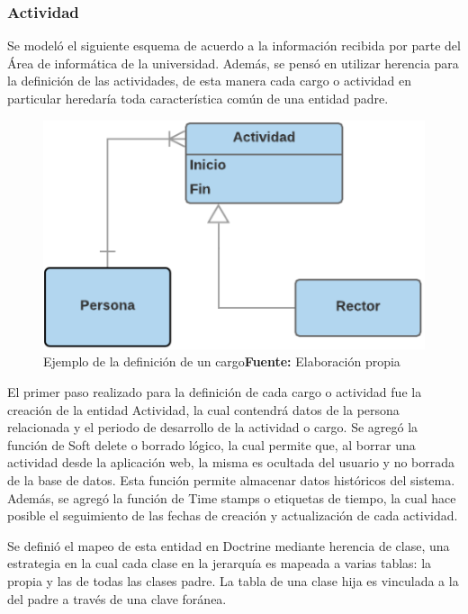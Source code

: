 \subsubsection{Actividad}%
\label{ssub:actividad}
Se modeló el siguiente esquema de acuerdo a la información recibida por parte del Área de informática de la universidad\@.
Además, se pensó en utilizar herencia para la definición de las actividades, de esta manera cada cargo o actividad en particular
heredaría toda característica común de una entidad padre.

\begin{figure}[h]
    \includegraphics[scale=1]{image/actividad-modelo.png}
    \caption{Ejemplo de la definición de un cargo\newline \textbf{Fuente:} Elaboración propia}%
    \label{fig:image/actividad-modelo}
\end{figure}
El primer paso realizado para la definición de cada cargo o actividad fue la creación de la entidad Actividad, la cual contendrá
datos de la persona relacionada y el periodo de desarrollo de la actividad o cargo\@.
Se agregó la función de Soft delete o borrado lógico, la cual permite que, al borrar una actividad desde la aplicación web,
la misma es ocultada del usuario y no borrada de la base de datos\@. Esta función permite almacenar datos históricos del sistema\@.
Además, se agregó la función de Time stamps o etiquetas de tiempo, la cual hace posible el seguimiento de las fechas de creación
y actualización de cada actividad.


Se definió el mapeo de esta entidad en Doctrine mediante herencia de clase, una estrategia en la cual cada clase en la jerarquía es mapeada a varias tablas:
la propia y las de todas las clases padre. La tabla de una clase hija es vinculada a la del padre a través de una clave foránea.


